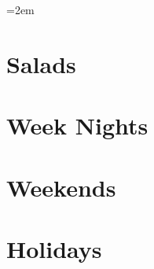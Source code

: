 \documentclass[landscape,12pt,openany]{book}
\begin{document}
\rmfamily

\setlength{\columnseprule}{0pt}
\columnsep=2em

\setcounter{tocdepth}{1}
\small
\tableofcontents

\newpage
\thispagestyle{empty}
\mbox{}

\normalsize

\setlength{\parskip}{.5em}

\chapter{Salads}









\chapter{Week Nights}











\chapter{Weekends}










\chapter{Holidays}



\setlength{\parskip}{0pt}
\listoffigures
\end{document}

